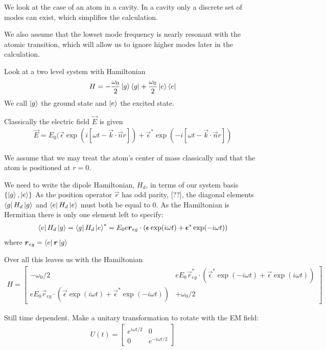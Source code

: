 We look at the case of an atom in a cavity. In a cavity only a discrete set of modes can exist, which simplifies the calculation.

We also assume that the lowset mode frequency is nearly resonant with the atomic transition, which will allow us to ignore higher modes later in the calculation.

Look at a two level system with Hamiltonian
\begin{align}
  H = -\frac{\omega_0}{2}\left\vert g\right\rangle\left\langle g\right\vert +\frac{\omega_0}{2}\left\vert e\right\rangle\left\langle e\right\vert
\end{align}
We call $\left\vert g\right\rangle$ the ground state and $\left\vert e\right\rangle$ the excited state. 


Classically the electric field $\vec{E}$ is given
\begin{align}
  \vec{E} = E_0 (\vec{\epsilon}\exp(i[\omega t - \vec{k}\cdot\vec{n}r]) + \vec{\epsilon}^*\exp(-i[\omega t - \vec{k}\cdot\vec{n}r])
\end{align}

We assume that we may treat the atom's center of mass classically and that the atom is positioned at $r=0$.

We need to write the dipole Hamiltonian, $H_d$, in terms of our system basis $\{\left\vert g\right\rangle, \left\vert e\right\rangle\}$
As the position operator $\vec{r}$ has odd parity, [??], the diagonal elements $\left\langle g\right\vert H_d\left\vert g\right\rangle$ and $\left\langle e\right\vert H_d\left\vert e\right\rangle$ must both be equal to $0$. As the Hamiltonian is Hermitian there is only one element left to specify:
\begin{align}
  \left\langle e\right\vert H_d\left\vert g\right\rangle = \left\langle g\right\vert H_d\left\vert e\right\rangle^* = E_0e{\boldsymbol{r}}_{eg}\cdot({\boldsymbol{\epsilon}}\exp(i\omega t) + {\boldsymbol{\epsilon}}^*\exp(-i\omega t))
\end{align}
where ${\boldsymbol{r}}_{eg} = \left\langle e\right\vert{\boldsymbol{r}}\left\vert g\right\rangle$

Over all this leaves us with the Hamiltonian
\begin{align}
  H =
  \begin{bmatrix}
    -\omega_0/2 & eE_0\vec{r}_{eg}^*\cdot(\vec{\epsilon}^*\exp(-i\omega t) + \vec{\epsilon}\exp(i\omega t)) \\
    eE_0\vec{r}_{eg}\cdot(\vec{\epsilon}\exp(i\omega t) + \vec{\epsilon}^*\exp(-i\omega t)) & +\omega_0/2
  \end{bmatrix}
\end{align}

Still time dependent. Make a unitary transformation to rotate with the EM field:
\begin{align}
  U(t) =
  \begin{bmatrix}
    e^{i\omega t/2} & 0 \\
    0 & e^{-i\omega t/2}
  \end{bmatrix}
\end{align}

